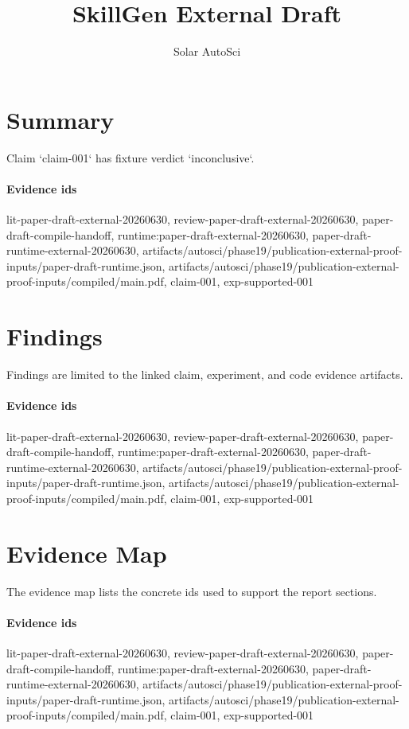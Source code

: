 \documentclass{article}
\title{SkillGen External Draft}
\author{Solar AutoSci}
\date{}
\begin{document}
\maketitle

\section{Summary}
Claim `claim-001` has fixture verdict `inconclusive`.

\paragraph{Evidence ids} lit-paper-draft-external-20260630, review-paper-draft-external-20260630, paper-draft-compile-handoff, runtime:paper-draft-external-20260630, paper-draft-runtime-external-20260630, artifacts/autosci/phase19/publication-external-proof-inputs/paper-draft-runtime.json, artifacts/autosci/phase19/publication-external-proof-inputs/compiled/main.pdf, claim-001, exp-supported-001

\section{Findings}
Findings are limited to the linked claim, experiment, and code evidence artifacts.

\paragraph{Evidence ids} lit-paper-draft-external-20260630, review-paper-draft-external-20260630, paper-draft-compile-handoff, runtime:paper-draft-external-20260630, paper-draft-runtime-external-20260630, artifacts/autosci/phase19/publication-external-proof-inputs/paper-draft-runtime.json, artifacts/autosci/phase19/publication-external-proof-inputs/compiled/main.pdf, claim-001, exp-supported-001

\section{Evidence Map}
The evidence map lists the concrete ids used to support the report sections.

\paragraph{Evidence ids} lit-paper-draft-external-20260630, review-paper-draft-external-20260630, paper-draft-compile-handoff, runtime:paper-draft-external-20260630, paper-draft-runtime-external-20260630, artifacts/autosci/phase19/publication-external-proof-inputs/paper-draft-runtime.json, artifacts/autosci/phase19/publication-external-proof-inputs/compiled/main.pdf, claim-001, exp-supported-001
\end{document}
